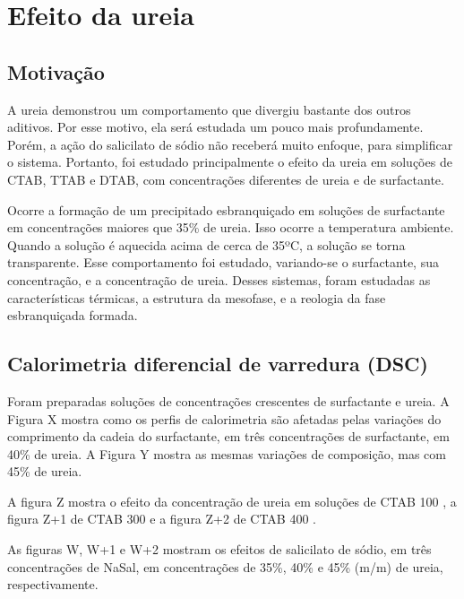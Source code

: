 \chapter{Efeito da ureia}
	\section{Motivação}
	A ureia demonstrou um comportamento que divergiu bastante dos outros aditivos. Por esse motivo, ela será estudada um pouco mais profundamente. Porém, a ação do salicilato de sódio não receberá muito enfoque, para simplificar o sistema. Portanto, foi estudado principalmente o efeito da ureia em soluções de CTAB, TTAB e DTAB, com concentrações diferentes de ureia e de surfactante.
	
	Ocorre a formação de um precipitado esbranquiçado em soluções de surfactante em concentrações maiores que 35\% de ureia. Isso ocorre a temperatura ambiente. Quando a solução é aquecida acima de cerca de 35ºC, a solução se torna transparente. Esse comportamento foi estudado, variando-se o surfactante, sua concentração, e a concentração de ureia. Desses sistemas, foram estudadas as características térmicas, a estrutura da mesofase, e a reologia da fase esbranquiçada formada.
	
	\section{Calorimetria diferencial de varredura (DSC)}
		Foram preparadas soluções de concentrações crescentes de surfactante e ureia. A Figura X mostra como os perfis de calorimetria são afetadas pelas variações do comprimento da cadeia do surfactante, em três concentrações de surfactante, em 40\% de ureia. A Figura Y mostra as mesmas variações de composição, mas com 45\% de ureia.
		
		
		
		A figura Z mostra o efeito da concentração de ureia em soluções de CTAB 100 \mM{}, a figura Z+1 de CTAB 300 \mM{} e a figura Z+2 de CTAB 400 \mM.
		
		As figuras W, W+1 e W+2 mostram os efeitos de salicilato de sódio, em três concentrações de NaSal, em concentrações de 35\%, 40\% e 45\% (m/m) de ureia, respectivamente.
		
		
